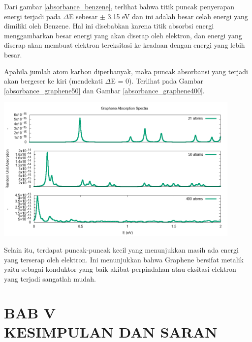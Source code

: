 \documentclass[12pt,a4paper]{report}
\begin{document}
Dari gambar \ref{absorbance_benzene}, terlihat bahwa titik puncak penyerapan energi terjadi pada $\Delta$E sebesar $\pm$ 3.15 eV dan ini adalah besar celah energi yang dimiliki oleh Benzene. Hal ini disebabkan karena titik absorbsi energi menggambarkan besar energi yang akan diserap oleh elektron, dan energi yang diserap akan membuat elektron tereksitasi ke keadaan dengan energi yang lebih besar.

Apabila jumlah atom karbon diperbanyak, maka puncak absorbansi yang terjadi akan bergeser ke kiri (mendekati $\Delta$E = 0). Terlihat pada Gambar \ref{absorbance_graphene50} dan Gambar \ref{absorbance_graphene400}.
\begin{center}
	\includegraphics[width=12cm]{gambar/spectra-graphene.png}
	\label{absorbance_graphene50}
\end{center}

Selain itu, terdapat puncak-puncak kecil yang menunjukkan masih ada energi yang terserap oleh elektron. Ini menunjukkan bahwa Graphene bersifat metalik yaitu sebagai konduktor yang baik akibat perpindahan atau eksitasi elektron yang terjadi sangatlah mudah.


\chapter*{BAB V \\ KESIMPULAN DAN SARAN}
\setcounter{chapter}{5}
\setcounter{section}{0}
\setcounter{figure}{0}
\thispagestyle{myplain}
\end{document}
